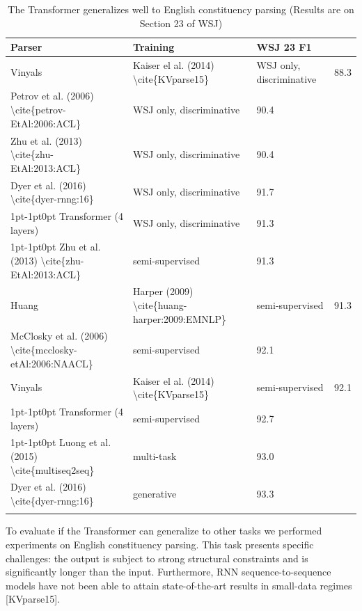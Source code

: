\documentclass[11pt,a4paper]{article}
\begin{document}
\begin{table}[h]
\caption{The Transformer generalizes well to English constituency parsing (Results are on Section 23 of WSJ)}
\begin{tabular}{|l|l|l|l|}
\hline
Parser & Training & WSJ 23 F1 &  \\ \hline
Vinyals & Kaiser el al. (2014) \textbackslash{}cite\{KVparse15\} & WSJ only, discriminative & 88.3 \\ \hline
Petrov et al. (2006) \textbackslash{}cite\{petrov-EtAl:2006:ACL\} & WSJ only, discriminative & 90.4 &  \\ \hline
Zhu et al. (2013) \textbackslash{}cite\{zhu-EtAl:2013:ACL\} & WSJ only, discriminative & 90.4 &  \\ \hline
Dyer et al. (2016) \textbackslash{}cite\{dyer-rnng:16\} & WSJ only, discriminative & 91.7 &  \\ \hline
1pt-1pt0pt Transformer (4 layers) & WSJ only, discriminative & 91.3 &  \\ \hline
1pt-1pt0pt Zhu et al. (2013) \textbackslash{}cite\{zhu-EtAl:2013:ACL\} & semi-supervised & 91.3 &  \\ \hline
Huang & Harper (2009) \textbackslash{}cite\{huang-harper:2009:EMNLP\} & semi-supervised & 91.3 \\ \hline
McClosky et al. (2006) \textbackslash{}cite\{mcclosky-etAl:2006:NAACL\} & semi-supervised & 92.1 &  \\ \hline
Vinyals & Kaiser el al. (2014) \textbackslash{}cite\{KVparse15\} & semi-supervised & 92.1 \\ \hline
1pt-1pt0pt Transformer (4 layers) & semi-supervised & 92.7 &  \\ \hline
1pt-1pt0pt Luong et al. (2015) \textbackslash{}cite\{multiseq2seq\} & multi-task & 93.0 &  \\ \hline
Dyer et al. (2016) \textbackslash{}cite\{dyer-rnng:16\} & generative & 93.3 &  \\ \hline
 &  &  &  \\ \hline
\end{tabular}
\end{table}

To evaluate if the Transformer can generalize to other tasks we performed experiments on English constituency parsing. This task presents specific challenges: the output is subject to strong structural constraints and is significantly longer than the input. Furthermore, RNN sequence-to-sequence models have not been able to attain state-of-the-art results in small-data regimes [KVparse15].
\end{document}
